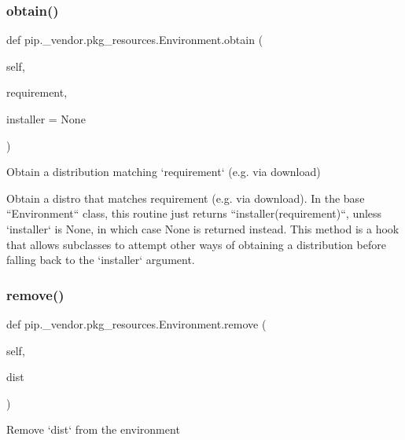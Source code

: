 \subsubsection{\texorpdfstring{obtain()}{obtain()}}
{\footnotesize\ttfamily def pip.\+\_\+vendor.\+pkg\+\_\+resources.\+Environment.\+obtain (\begin{DoxyParamCaption}\item[{}]{self,  }\item[{}]{requirement,  }\item[{}]{installer = {\ttfamily None} }\end{DoxyParamCaption})}

\begin{DoxyVerb}Obtain a distribution matching `requirement` (e.g. via download)

Obtain a distro that matches requirement (e.g. via download).  In the
base ``Environment`` class, this routine just returns
``installer(requirement)``, unless `installer` is None, in which case
None is returned instead.  This method is a hook that allows subclasses
to attempt other ways of obtaining a distribution before falling back
to the `installer` argument.\end{DoxyVerb}
 \mbox{\label{classpip_1_1__vendor_1_1pkg__resources_1_1Environment_ad424a6f98e59ec9b6153bfbebeb6130e}} 
\subsubsection{\texorpdfstring{remove()}{remove()}}
{\footnotesize\ttfamily def pip.\+\_\+vendor.\+pkg\+\_\+resources.\+Environment.\+remove (\begin{DoxyParamCaption}\item[{}]{self,  }\item[{}]{dist }\end{DoxyParamCaption})}

\begin{DoxyVerb}Remove `dist` from the environment\end{DoxyVerb}
 \mbox{\label{classpip_1_1__vendor_1_1pkg__resources_1_1Environment_ab899471d6564a9869592df78700a24f1}} 
